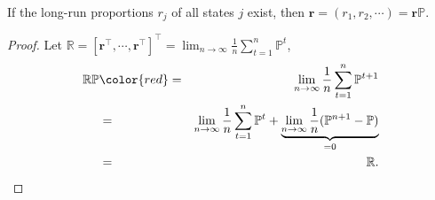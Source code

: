 \begin{lemma} \label{lem:r-eq-rp}
If the long-run proportions $ r_{j} $ of all states $ j $ exist, then $ \mathbf{r} = (r_{1}, r_{2}, \cdots) = \mathbf{r}\mathbb{P} $.

\begin{proof}
Let $ \mathbb{R} = [\mathbf{r}^{\intercal}, \cdots, \mathbf{r}^{\intercal}]^{\intercal} = \lim_{n \to \infty} \frac{1}{n} \sum_{t = 1}^{n} \mathbb{P}^{t} $,
\begin{eqnarray*}
\mathbb{R}\mathbb{P}
  & {\color{red} =} & \lim_{n \to \infty} \frac{1}{n} \sum_{t = 1}^{n} \mathbb{P}^{t + 1} \\
  & = & \lim_{n \to \infty} \frac{1}{n} \sum_{t = 1}^{n} \mathbb{P}^{t}
      + \underbrace{\lim_{n \to \infty} \frac{1}{n} (\mathbb{P}^{n + 1} - \mathbb{P})}_{= 0} \\
  & = & \mathbb{R}.
\end{eqnarray*}
\end{proof}

\begin{comment}
\begin{eqnarray*}
(\mathbb{R}\mathbb{P})[i, j]
  & = & \sum_{k \in \mathcal{S}} r_{k} \cdot \mathbb{P}[k, j] \\
  & = & \sum_{k \in \mathcal{S}} \lim_{n \to \infty} \frac{1}{n} \sum_{t = 1}^{n} \mathbb{P}^{t}[i, k] \cdot \mathbb{P}[k, j] \\
  & = & \lim_{m \to \infty} \lim_{n \to \infty} \frac{1}{n} \sum_{t = 1}^{n} \sum_{k = 1}^{m} \mathbb{P}^{t}[i, k] \cdot \mathbb{P}[k, j] \\
  & \le & \lim_{m \to \infty} \lim_{n \to \infty} \frac{1}{n} \sum_{t = 1}^{n} \sum_{k \in \mathcal{S}} \mathbb{P}^{t}[i, k] \cdot \mathbb{P}[k, j] \\
  & = & \lim_{m \to \infty} \lim_{n \to \infty} \frac{1}{n} \sum_{t = 1}^{n} \mathbb{P}^{t + 1}[i, j] \\
  & = & \lim_{n \to \infty} \frac{1}{n} \sum_{t = 1}^{n} \mathbb{P}^{t + 1}[i, j],
\end{eqnarray*}


\end{comment}
\end{lemma}
